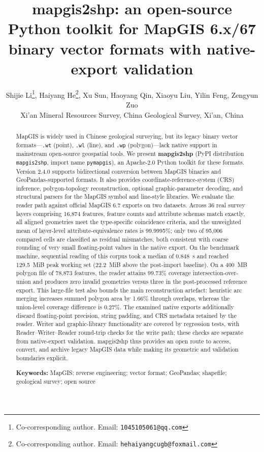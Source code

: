 \documentclass[11pt,a4paper]{article}
\title{mapgis2shp: an open-source Python toolkit for MapGIS 6.x/67 binary vector formats with native-export validation}
\author{%
  Shijie Li\thanks{Co-corresponding author. Email: \texttt{1045105061@qq.com}}, %
  Haiyang He\thanks{Co-corresponding author. Email: \texttt{hehaiyangcugb@foxmail.com}}, %
  Xu Sun, Haoyang Qin, Xiaoyu Liu, Yilin Feng, Zengyun Zuo \\[2pt]
  \small Xi'an Mineral Resources Survey, China Geological Survey, Xi'an, China%
}
\date{}
\begin{document}
\maketitle

\begin{abstract}
\noindent
MapGIS is widely used in Chinese geological surveying, but its legacy binary vector formats---\texttt{.wt} (point), \texttt{.wl} (line), and \texttt{.wp} (polygon)---lack native support in mainstream open-source geospatial tools. We present \textbf{mapgis2shp} (PyPI distribution \texttt{mapgis2shp}, import name \texttt{pymapgis}), an Apache-2.0 Python toolkit for these formats. Version 2.4.0 supports bidirectional conversion between MapGIS binaries and GeoPandas-supported formats. It also provides coordinate-reference-system (CRS) inference, polygon-topology reconstruction, optional graphic-parameter decoding, and structural parsers for the MapGIS symbol and line-style libraries. We evaluate the reader path against official MapGIS 6.7 exports on two datasets. Across 36 real survey layers comprising 16{,}874 features, feature counts and attribute schemas match exactly, all aligned geometries meet the type-specific coincidence criteria, and the unweighted mean of layer-level attribute-equivalence rates is 99.9995\%; only two of 95{,}006 compared cells are classified as residual mismatches, both consistent with coarse rounding of very small floating-point values in the native export. On the benchmark machine, sequential reading of this corpus took a median of 0.848~s and reached 129.5~MiB peak working set (22.2~MiB above the post-import baseline). On a 400~MB polygon file of 78{,}873 features, the reader attains 99.73\% coverage intersection-over-union and produces zero invalid geometries versus three in the post-processed reference export. This large-file test also bounds the main reconstruction artefact: heuristic arc merging increases summed polygon area by 1.66\% through overlaps, whereas the union-level coverage difference is 0.27\%. The examined native exports additionally discard floating-point precision, string padding, and CRS metadata retained by the reader. Writer and graphic-library functionality are covered by regression tests, with Reader--Writer--Reader round-trip checks for the write path; these checks are separate from native-export validation. mapgis2shp thus provides an open route to access, convert, and archive legacy MapGIS data while making its geometric and validation boundaries explicit.

\medskip
\noindent\textbf{Keywords:} MapGIS; reverse engineering; vector format; GeoPandas; shapefile; geological survey; open source
\end{abstract}
\end{document}
